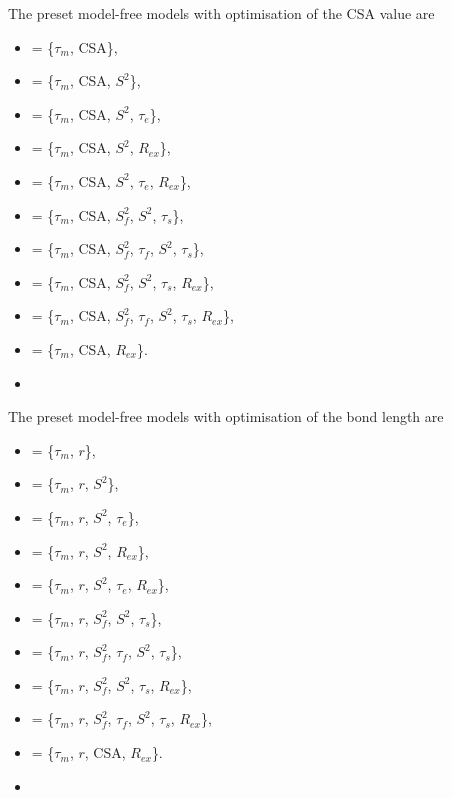  The preset model-free models with optimisation of the CSA value are 
  

 \begin{itemize} 
 \item[]  = \{$\tau_m$, CSA\},  
 \item[]  = \{$\tau_m$, CSA, $S^2$\},  
 \item[]  = \{$\tau_m$, CSA, $S^2$, $\tau_e$\},  
 \item[]  = \{$\tau_m$, CSA, $S^2$, $R_{ex}$\},  
 \item[]  = \{$\tau_m$, CSA, $S^2$, $\tau_e$, $R_{ex}$\},  
 \item[]  = \{$\tau_m$, CSA, $S^2_f$, $S^2$, $\tau_s$\},  
 \item[]  = \{$\tau_m$, CSA, $S^2_f$, $\tau_f$, $S^2$, $\tau_s$\},  
 \item[]  = \{$\tau_m$, CSA, $S^2_f$, $S^2$, $\tau_s$, $R_{ex}$\},  
 \item[]  = \{$\tau_m$, CSA, $S^2_f$, $\tau_f$, $S^2$, $\tau_s$, $R_{ex}$\},  
 \item[]  = \{$\tau_m$, CSA, $R_{ex}$\}.  
 \item[]  
 \end{itemize} 
  

 The preset model-free models with optimisation of the bond length are 
  

 \begin{itemize} 
 \item[]  = \{$\tau_m$, $r$\},  
 \item[]  = \{$\tau_m$, $r$, $S^2$\},  
 \item[]  = \{$\tau_m$, $r$, $S^2$, $\tau_e$\},  
 \item[]  = \{$\tau_m$, $r$, $S^2$, $R_{ex}$\},  
 \item[]  = \{$\tau_m$, $r$, $S^2$, $\tau_e$, $R_{ex}$\},  
 \item[]  = \{$\tau_m$, $r$, $S^2_f$, $S^2$, $\tau_s$\},  
 \item[]  = \{$\tau_m$, $r$, $S^2_f$, $\tau_f$, $S^2$, $\tau_s$\},  
 \item[]  = \{$\tau_m$, $r$, $S^2_f$, $S^2$, $\tau_s$, $R_{ex}$\},  
 \item[]  = \{$\tau_m$, $r$, $S^2_f$, $\tau_f$, $S^2$, $\tau_s$, $R_{ex}$\},  
 \item[]  = \{$\tau_m$, $r$, CSA, $R_{ex}$\}.  
 \item[]  
 \end{itemize} 
  

